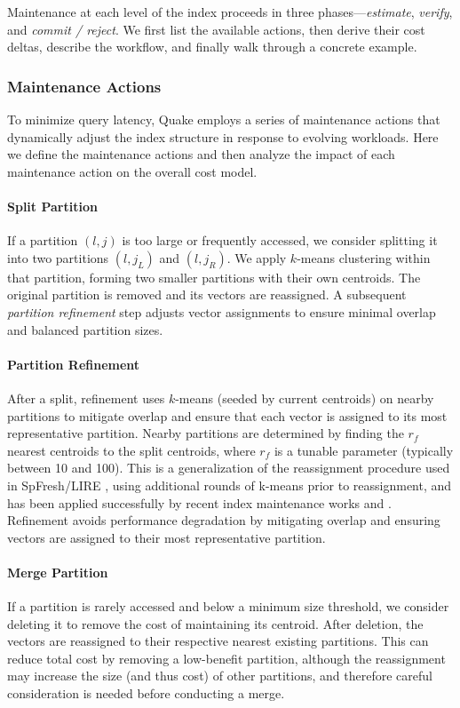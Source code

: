 Maintenance at each level of the index proceeds in three phases—\emph{estimate}, \emph{verify},
and \emph{commit / reject}.  We first list the available actions,
then derive their cost deltas, describe the workflow, and finally walk
through a concrete example.

\subsubsection{Maintenance Actions}

To minimize query latency, Quake employs a series of maintenance actions that dynamically adjust the index structure in response to evolving workloads. Here we define the maintenance actions and then analyze the impact of each maintenance action on the overall cost model. 

\paragraph{Split Partition} If a partition $(l,j)$ is too large or frequently accessed, we consider splitting it into two partitions $(l,j_L)$ and $(l,j_R)$. We apply $k$-means clustering within that partition, forming two smaller partitions with their own centroids. The original partition is removed and its vectors are reassigned. A subsequent \emph{partition refinement} step adjusts vector assignments to ensure minimal overlap and balanced partition sizes.

\paragraph{Partition Refinement} After a split, refinement uses $k$-means (seeded by current centroids) on nearby partitions to mitigate overlap and ensure that each vector is assigned to its most representative partition. Nearby partitions are determined by finding the $r_f$ nearest centroids to the split centroids, where $r_f$ is a tunable parameter (typically between 10 and 100). This is a generalization of the reassignment procedure used in SpFresh/LIRE \cite{xu_spfresh_2023}, using additional rounds of k-means prior to reassignment, and has been applied successfully by recent index maintenance works \cite{mageirakos2025cracking} and \cite{mohoney2024incremental}. Refinement avoids performance degradation by mitigating overlap and ensuring vectors are assigned to their most representative partition.

\paragraph{Merge Partition} If a partition is rarely accessed and below a minimum size threshold, we consider deleting it to remove the cost of maintaining its centroid. After deletion, the vectors are reassigned to their respective nearest existing partitions. This can reduce total cost by removing a low-benefit partition, although the reassignment may increase the size (and thus cost) of other partitions, and therefore careful consideration is needed before conducting a merge.


